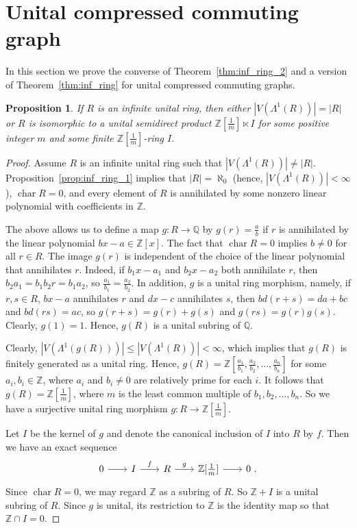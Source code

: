 \documentclass[12pt,a4paper]{amsart}
\newtheorem{proposition}{Proposition}
\theoremstyle{definition}
\newcommand{\Q}{\mathbb{Q}}
\newcommand{\Z}{\mathbb{Z}}
\DeclareMathOperator{\ch}{char}
\begin{document}
\section{Unital compressed commuting graph}\label{sec:unital}

In this section we prove the converse of Theorem~\ref{thm:inf_ring_2} and a version of Theorem~\ref{thm:inf_ring} for unital compressed commuting graphs.

\begin{proposition}\label{thm:inf_ring_1}
    If $R$ is an infinite unital ring, then either $|V(\Lambda^1(R))|=|R|$ or $R$ is isomorphic to a unital semidirect product $\Z[\frac1m] \ltimes I$ for some positive integer $m$ and some finite $\Z[\frac1m]$-ring $I$.
\end{proposition}

\begin{proof}
Assume $R$ is an infinite unital ring such that $|V(\Lambda^1(R))| \neq |R|$.
Proposition~\ref{prop:inf_ring_1} implies that $|R|=\aleph_0$ (hence, $|V(\Lambda^1(R))|<\infty$), $\ch R = 0$, and every element of $R$ is annihilated by some nonzero linear polynomial with coefficients in $\Z$.

The above allows us to define a map $g \colon R \to \Q$ by $g(r)=\frac{a}{b}$ if $r$ is annihilated by the linear polynomial $bx-a \in \Z[x]$.
The fact that $\ch R = 0$ implies $b \neq 0$ for all $r \in R$.
The image $g(r)$ is independent of the choice of the linear polynomial that annihilates $r$. Indeed, if $b_1 x-a_1$ and $b_2x-a_2$ both annihilate $r$, then $b_2a_1=b_1b_2r=b_1a_2$, so $\frac{a_1}{b_1}=\frac{a_2}{b_2}$.
In addition, $g$ is a unital ring morphism, namely, if $r,s \in R$, $bx-a$ annihilates $r$ and $dx-c$ annihilates $s$, then $bd(r+s)=da+bc$ and $bd(rs)=ac$, so $g(r+s)=g(r)+g(s)$ and $g(rs)=g(r)g(s)$. Clearly, $g(1)=1$.
Hence, $g(R)$ is a unital subring of $\Q$.

Clearly, $|V(\Lambda^1(g(R)))| \leq |V(\Lambda^1(R))|<\infty$, which implies that $g(R)$ is finitely generated as a unital ring.
Hence, $g(R)=\Z[\frac{a_1}{b_1},\frac{a_2}{b_2},\ldots,\frac{a_n}{b_n}]$ for some $a_i,b_i \in \Z$, where $a_i$ and $b_i \neq 0$ are relatively prime for each $i$.
It follows that $g(R)=\Z[\frac1m]$, where $m$ is the least common multiple of $b_1,b_2,\ldots,b_n$.
So we have a surjective unital ring morphism $g \colon R \to \Z[\frac1m]$.

Let $I$ be the kernel of $g$ and denote the canonical inclusion of $I$ into $R$ by $f$. Then we have an exact sequence
\begin{equation}\label{eq:exact}
\begin{tikzcd}[sep=20pt]
0 & I & R & \Z[\frac1m] & 0 \ .
\arrow[from=1-1, to=1-2]
\arrow["f", from=1-2, to=1-3]
\arrow["g", from=1-3, to=1-4]
\arrow[from=1-4, to=1-5]
\end{tikzcd}
\end{equation}
Since $\ch R = 0$, we may regard $\Z$ as a subring of $R$.
So $\Z+I$ is a unital subring of $R$. Since $g$ is unital, its restriction to $\Z$ is the identity map so that $\Z \cap I=0$. 


\end{proof}
\end{document}
